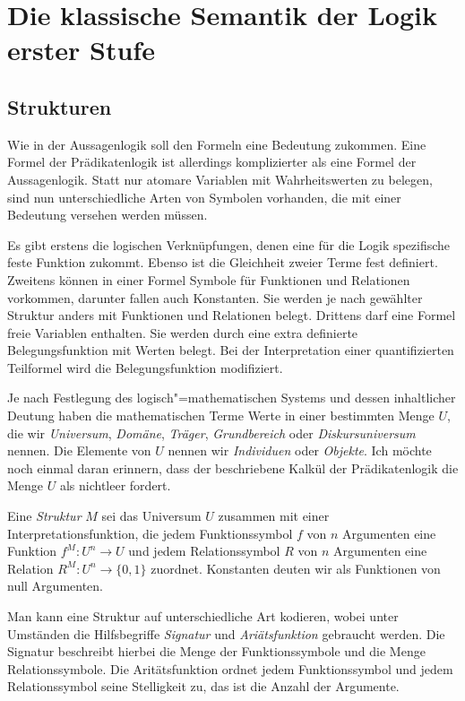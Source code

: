 \newpage
\section{Die klassische Semantik der Logik erster Stufe}

\subsection{Strukturen}

Wie in der Aussagenlogik soll den Formeln eine Bedeutung zukommen.
Eine Formel der Prädikatenlogik ist allerdings komplizierter als eine
Formel der Aussagenlogik. Statt nur atomare Variablen mit
Wahrheitswerten zu belegen, sind nun unterschiedliche Arten von
Symbolen vorhanden, die mit einer Bedeutung versehen werden müssen.

Es gibt erstens die logischen Verknüpfungen, denen eine für die
Logik spezifische feste Funktion zukommt. Ebenso ist die Gleichheit
zweier Terme fest definiert. Zweitens können in einer Formel Symbole
für Funktionen und Relationen vorkommen, darunter fallen auch
Konstanten. Sie werden je nach gewählter Struktur anders mit
Funktionen und Relationen belegt. Drittens darf eine Formel
freie Variablen enthalten. Sie werden durch eine extra definierte
Belegungsfunktion mit Werten belegt. Bei der Interpretation einer
quantifizierten Teilformel wird die Belegungsfunktion modifiziert.

Je nach Festlegung des logisch"=mathematischen Systems und dessen
inhaltlicher Deutung haben die mathematischen Terme Werte
in einer bestimmten Menge $U$, die wir \emph{Universum},
\emph{Domäne}, \emph{Träger}, \emph{Grundbereich} oder
\emph{Diskursuniversum} nennen.  Die Elemente von $U$ nennen wir
\emph{Individuen} oder \emph{Objekte}. Ich möchte noch einmal daran
erinnern, dass der beschriebene Kalkül der Prädikatenlogik die
Menge $U$ als nichtleer fordert.

Eine \emph{Struktur} $M$ sei das Universum $U$ zusammen mit einer
Interpretationsfunktion, die jedem Funktionssymbol $f$ von $n$ Argumenten
eine Funktion $f^M\colon U^n \to U$ und jedem Relationssymbol $R$ von
$n$ Argumenten eine Relation $R^M\colon U^n\to\{0,1\}$ zuordnet.
Konstanten deuten wir als Funktionen von null Argumenten.

Man kann eine Struktur auf unterschiedliche Art kodieren, wobei
unter Umständen die Hilfsbegriffe \emph{Signatur} und
\emph{Ariätsfunktion} gebraucht werden. Die Signatur beschreibt hierbei
die Menge der Funktionssymbole und die Menge Relationssymbole. Die
Aritätsfunktion ordnet jedem Funktionssymbol und jedem Relationssymbol
seine Stelligkeit zu, das ist die Anzahl der Argumente.

